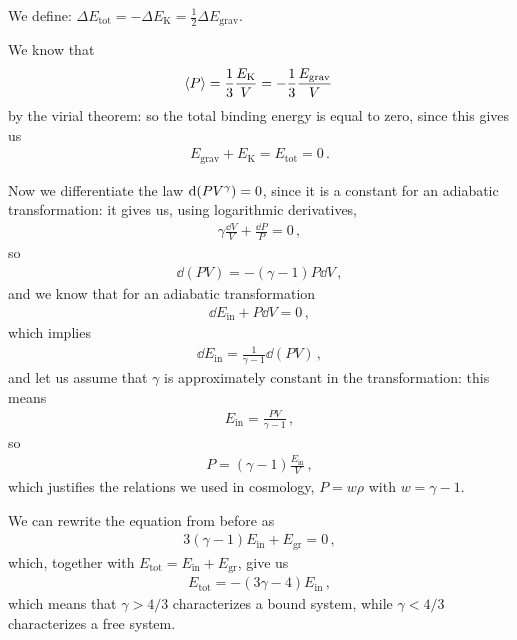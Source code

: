 \documentclass[main.tex]{subfiles}
\begin{document}
We define: \(\Delta E _{\text{tot}} = - \Delta E _{\text{K}} = \frac{1}{2} \Delta E _{\text{grav}}\). 

We know that 
%
\begin{align}
  \expval{P} = \frac{1}{3} \frac{E _{\text{K}}}{V} = -\frac{1}{3} \frac{E _{\text{grav}}}{V}
\,
\end{align}
%
by the virial theorem: so the total binding energy is equal to zero, since this gives us 
%
\begin{align}
  E _{\text{grav}} + E _{\text{K}} = E _{\text{tot}} = 0
\,.
\end{align}
%

Now we differentiate the law \(\dd \qty(P V^{\gamma }) = 0\), since it is a constant for an adiabatic transformation: it gives us, using logarithmic derivatives, 
%
\begin{align}
  \gamma \frac{ \dd{V}}{V} + \frac{ \dd{P}}{P} = 0
\,,
\end{align}
%
so 
%
\begin{align}
  \dd{(PV)} = - (\gamma -1 ) P \dd{V}
\,,
\end{align}
%
and we know that for an adiabatic transformation 
%
\begin{align}
  \dd{E _{\text{in}}} + P \dd{V} = 0
\,,
\end{align}
%
which implies 
%
\begin{align}
  \dd{E _{\text{in}}} = \frac{1}{\gamma -1} \dd{(PV)}
\,,
\end{align}
%
and let us assume that \(\gamma \) is approximately constant in the transformation: this means 
%
\begin{align}
  E _{\text{in}} = \frac{PV}{\gamma -1}
\,,
\end{align}
%
so 
%
\begin{align}
  P = (\gamma -1 ) \frac{E _{\text{in}}}{V}
\,,
\end{align}
%
which justifies the relations we used in cosmology, \(P = w \rho \) with \(w = \gamma -1\). 

We can rewrite the equation from before as 
%
\begin{align}
  3(\gamma -1 ) E _{\text{in}} + E _{\text{gr}} = 0
\,,
\end{align}
%
which, together with \(E _{\text{tot}} = E _{\text{in}} + E _{\text{gr}}\), give us 
%
\begin{align}
  E _{\text{tot}} = - (3 \gamma - 4) E _{\text{in}}
\,,
\end{align}
%
which means that \(\gamma > 4/3\) characterizes a bound system, while \(\gamma < 4/3\) characterizes a free system. 
\end{document}
